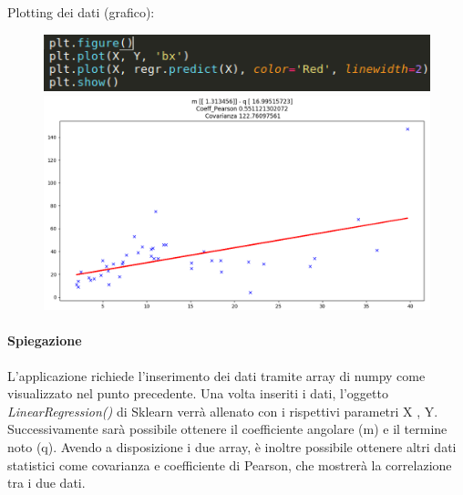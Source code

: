 \documentclass[a4paper,12pt,titlepage,oneside,openany]{book}
\begin{document}
Plotting dei dati (grafico):
\begin{figure}[H]
	\centering	\includegraphics{plotcode.png}
	\label{fig:plotcode}
\includegraphics[scale=0.4]{plotgraph.png}
	\label{fig:plotgraph}
\end{figure}
\newpage
\paragraph*{Spiegazione}
L’applicazione richiede l’inserimento dei dati tramite array di numpy come visualizzato nel punto precedente.
Una volta inseriti i dati, l’oggetto \textit{LinearRegression()} di Sklearn verrà allenato con i rispettivi parametri X , Y. Successivamente sarà possibile ottenere il coefficiente angolare (m) e il termine noto (q).
Avendo a disposizione i due array, è inoltre possibile ottenere altri dati statistici come covarianza e coefficiente di Pearson, che mostrerà la correlazione tra i due dati.
\end{document}
